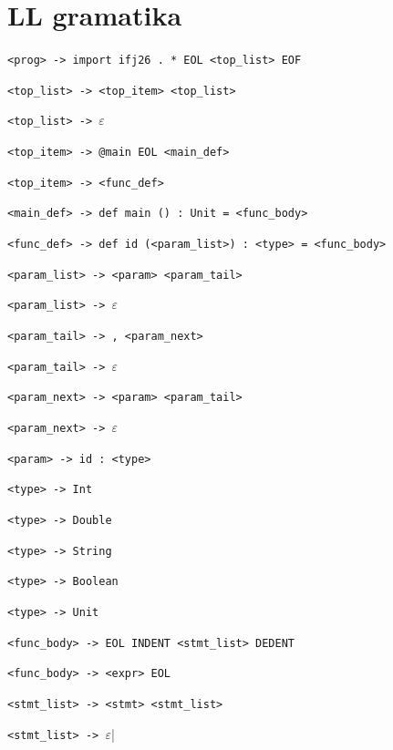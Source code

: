 \section{LL gramatika}\label{app:gramatika}



\begin{gramatika}
  
    \item \verb|<prog> -> import ifj26 . * EOL <top_list> EOF|
    \item \verb|<top_list> -> <top_item> <top_list>|
    \item \verb|<top_list> -> |$\varepsilon$
    \item \verb|<top_item> -> @main EOL <main_def>|
    \item \verb|<top_item> -> <func_def>|
    \item \verb|<main_def> -> def main () : Unit = <func_body>|
    \item \verb|<func_def> -> def id (<param_list>) : <type> = <func_body>|
    \item \verb|<param_list> -> <param> <param_tail>|
    \item \verb|<param_list> -> |$\varepsilon$
    \item \verb|<param_tail> -> , <param_next>|
    \item \verb|<param_tail> -> |$\varepsilon$
    \item \verb|<param_next> -> <param> <param_tail>|
    \item \verb|<param_next> -> |$\varepsilon$
    \item \verb|<param> -> id : <type>|
    \item \verb|<type> -> Int|
    \item \verb|<type> -> Double|
    \item \verb|<type> -> String|
    \item \verb|<type> -> Boolean|
    \item \verb|<type> -> Unit|
    \item \verb|<func_body> -> EOL INDENT <stmt_list> DEDENT|
    \item \verb|<func_body> -> <expr> EOL|
    \item \verb|<stmt_list> -> <stmt> <stmt_list>|
    \item \verb|<stmt_list> -> |$\varepsilon$|

\end{gramatika}
